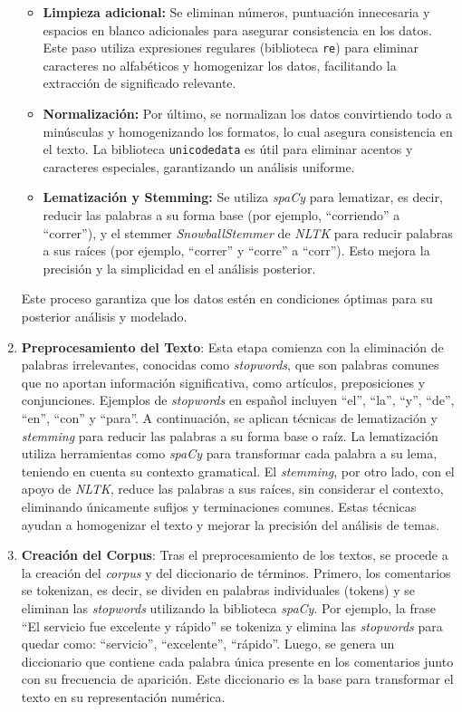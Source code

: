 \documentclass{matematicasud}
\begin{document}
\begin{enumerate}
\begin{itemize}
        \item \textbf{Limpieza adicional:} Se eliminan números, puntuación innecesaria y espacios en blanco adicionales para asegurar consistencia en los datos. Este paso utiliza expresiones regulares (biblioteca \texttt{re}) para eliminar caracteres no alfabéticos y homogenizar los datos, facilitando la extracción de significado relevante.
        
        \item \textbf{Normalización:} Por último, se normalizan los datos convirtiendo todo a minúsculas y homogenizando los formatos, lo cual asegura consistencia en el texto. La biblioteca \texttt{unicodedata} es útil para eliminar acentos y caracteres especiales, garantizando un análisis uniforme.
        
        \item \textbf{Lematización y Stemming:} Se utiliza \textit{spaCy} para lematizar, es decir, reducir las palabras a su forma base (por ejemplo, ``corriendo'' a ``correr''), y el stemmer \textit{SnowballStemmer} de \textit{NLTK} para reducir palabras a sus raíces (por ejemplo, ``correr'' y ``corre'' a ``corr''). Esto mejora la precisión y la simplicidad en el análisis posterior.
    \end{itemize}

    Este proceso garantiza que los datos estén en condiciones óptimas para su posterior análisis y modelado.
    
    \item \textbf{Preprocesamiento del Texto}: Esta etapa comienza con la eliminación de palabras irrelevantes, conocidas como \textit{stopwords}, que son palabras comunes que no aportan información significativa, como artículos, preposiciones y conjunciones. Ejemplos de \textit{stopwords} en español incluyen ``el'', ``la'', ``y'', ``de'', ``en'', ``con'' y ``para''. A continuación, se aplican técnicas de lematización y \textit{stemming} para reducir las palabras a su forma base o raíz. La lematización utiliza herramientas como \textit{spaCy} para transformar cada palabra a su lema, teniendo en cuenta su contexto gramatical. El \textit{stemming}, por otro lado, con el apoyo de \textit{NLTK}, reduce las palabras a sus raíces, sin considerar el contexto, eliminando únicamente sufijos y terminaciones comunes. Estas técnicas ayudan a homogenizar el texto y mejorar la precisión del análisis de temas.


    
    \item \textbf{Creación del Corpus}: Tras el preprocesamiento de los textos, se procede a la creación del \textit{corpus} y del diccionario de términos. Primero, los comentarios se tokenizan, es decir, se dividen en palabras individuales (tokens) y se eliminan las \textit{stopwords} utilizando la biblioteca \textit{spaCy}. Por ejemplo, la frase ``El servicio fue excelente y rápido'' se tokeniza y elimina las \textit{stopwords} para quedar como: ``servicio'', ``excelente'', ``rápido''. Luego, se genera un diccionario que contiene cada palabra única presente en los comentarios junto con su frecuencia de aparición. Este diccionario es la base para transformar el texto en su representación numérica.
    

\end{enumerate}
\end{document}
